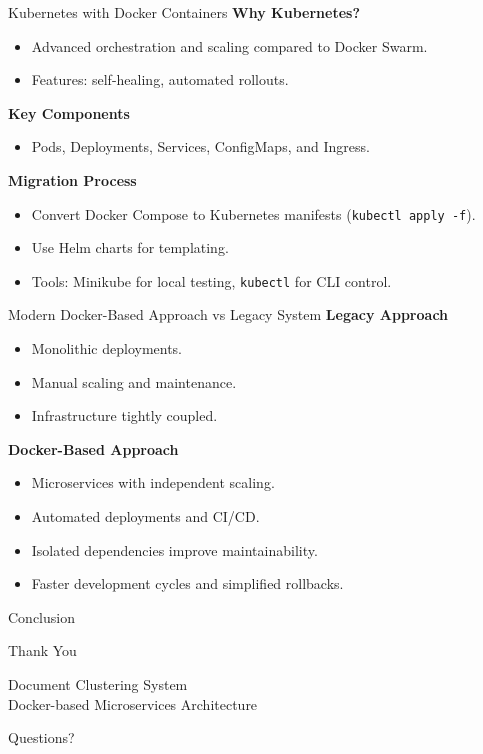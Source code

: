 \documentclass[notes]{beamer}
\begin{document}
{\begin{frame}{Kubernetes with Docker Containers}
    \textbf{Why Kubernetes?}
    \begin{itemize}
        \item Advanced orchestration and scaling compared to Docker Swarm.
        \item Features: self-healing, automated rollouts.
    \end{itemize}
    \textbf{Key Components}
    \begin{itemize}
        \item Pods, Deployments, Services, ConfigMaps, and Ingress.
    \end{itemize}
    \textbf{Migration Process}
    \begin{itemize}
        \item Convert Docker Compose to Kubernetes manifests (\texttt{kubectl apply -f}).
        \item Use Helm charts for templating.
        \item Tools: Minikube for local testing, \texttt{kubectl} for CLI control.
    \end{itemize}
\end{frame}

\begin{frame}{Modern Docker-Based Approach vs Legacy System}
    \textbf{Legacy Approach}
    \begin{itemize}
        \item Monolithic deployments.
        \item Manual scaling and maintenance.
        \item Infrastructure tightly coupled.
    \end{itemize}
    \textbf{Docker-Based Approach}
    \begin{itemize}
        \item Microservices with independent scaling.
        \item Automated deployments and CI/CD.
        \item Isolated dependencies improve maintainability.
        \item Faster development cycles and simplified rollbacks.
    \end{itemize}
\end{frame}
}

\begin{frame}{Conclusion}
    \begin{center}
        \Large{Thank You}
        
        \vspace{0.5cm}
        \normalsize{Document Clustering System}\\
        Docker-based Microservices Architecture
        
        \vspace{0.5cm}
        Questions?
    \end{center}
\end{frame}
\end{document}

